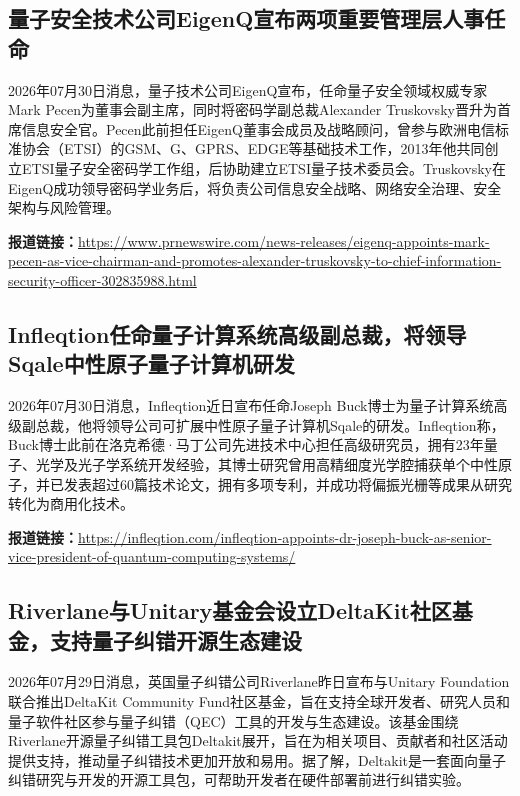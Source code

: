 \documentclass[12pt,a4paper]{ctexart}
\begin{document}
\subsection{ 量子安全技术公司EigenQ宣布两项重要管理层人事任命 }

2026年07月30日消息，量子技术公司EigenQ宣布，任命量子安全领域权威专家Mark Pecen为董事会副主席，同时将密码学副总裁Alexander Truskovsky晋升为首席信息安全官。Pecen此前担任EigenQ董事会成员及战略顾问，曾参与欧洲电信标准协会（ETSI）的GSM、G、GPRS、EDGE等基础技术工作，2013年他共同创立ETSI量子安全密码学工作组，后协助建立ETSI量子技术委员会。Truskovsky在EigenQ成功领导密码学业务后，将负责公司信息安全战略、网络安全治理、安全架构与风险管理。

\noindent\textbf{报道链接：}\url{https://www.prnewswire.com/news-releases/eigenq-appoints-mark-pecen-as-vice-chairman-and-promotes-alexander-truskovsky-to-chief-information-security-officer-302835988.html}

\subsection{ Infleqtion任命量子计算系统高级副总裁，将领导Sqale中性原子量子计算机研发 }

2026年07月30日消息，Infleqtion近日宣布任命Joseph Buck博士为量子计算系统高级副总裁，他将领导公司可扩展中性原子量子计算机Sqale的研发。Infleqtion称，Buck博士此前在洛克希德·马丁公司先进技术中心担任高级研究员，拥有23年量子、光学及光子学系统开发经验，其博士研究曾用高精细度光学腔捕获单个中性原子，并已发表超过60篇技术论文，拥有多项专利，并成功将偏振光栅等成果从研究转化为商用化技术。

\noindent\textbf{报道链接：}\url{https://infleqtion.com/infleqtion-appoints-dr-joseph-buck-as-senior-vice-president-of-quantum-computing-systems/}

\subsection{ Riverlane与Unitary基金会设立DeltaKit社区基金，支持量子纠错开源生态建设 }

2026年07月29日消息，英国量子纠错公司Riverlane昨日宣布与Unitary Foundation联合推出DeltaKit Community Fund社区基金，旨在支持全球开发者、研究人员和量子软件社区参与量子纠错（QEC）工具的开发与生态建设。该基金围绕Riverlane开源量子纠错工具包Deltakit展开，旨在为相关项目、贡献者和社区活动提供支持，推动量子纠错技术更加开放和易用。据了解，Deltakit是一套面向量子纠错研究与开发的开源工具包，可帮助开发者在硬件部署前进行纠错实验。
\end{document}
